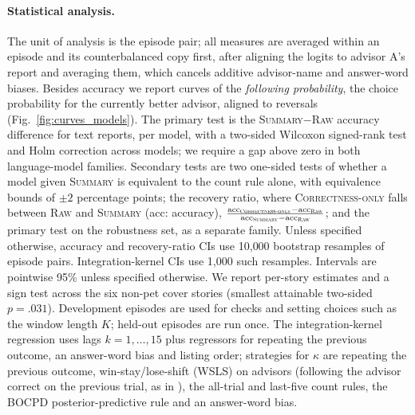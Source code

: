 \documentclass[letterpaper]{article} %
\newcommand{\Raw}{\textsc{Raw}}
\newcommand{\CorrectnessOnly}{\textsc{Correctness-only}}
\newcommand{\Summary}{\textsc{Summary}}
\begin{document}
\paragraph{Statistical analysis.} The unit of analysis is the episode pair; all measures are averaged within an episode and its counterbalanced copy first, after aligning the logits to advisor A's report and averaging them, which cancels additive advisor-name and answer-word biases. Besides accuracy we report curves of the \emph{following probability}, the choice probability for the currently better advisor, aligned to reversals (Fig.~\ref{fig:curves_models}). The primary test is the \Summary{}$-$\Raw{} accuracy difference for text reports, per model, with a two-sided Wilcoxon signed-rank test and Holm correction across models; we require a gap above zero in both language-model families. Secondary tests are two one-sided tests \citep[TOST;][]{lakens2017equivalence} of whether a model given \Summary{} is equivalent to the count rule alone, with equivalence bounds of $\pm 2$ percentage points; the recovery ratio, where \CorrectnessOnly{} falls between \Raw{} and \Summary{} (acc: accuracy), $\frac{\mathrm{acc}_{\text{\CorrectnessOnly{}}}-\mathrm{acc}_{\text{\Raw{}}}}{\mathrm{acc}_{\text{\Summary{}}}-\mathrm{acc}_{\text{\Raw{}}}}$; and the primary test on the robustness set, as a separate family. Unless specified otherwise, accuracy and recovery-ratio CIs use 10{,}000 bootstrap resamples of episode pairs. Integration-kernel CIs use 1{,}000 such resamples. Intervals are pointwise 95\% unless specified otherwise. We report per-story estimates and a sign test across the six non-pet cover stories (smallest attainable two-sided $p = .031$). Development episodes are used for checks and setting choices such as the window length $K$; held-out episodes are run once. The integration-kernel regression uses lags $k=1,\dots,15$ plus regressors for repeating the previous outcome, an answer-word bias and listing order; strategies for $\kappa$ are repeating the previous outcome, win-stay/lose-shift (WSLS) on advisors (following the advisor correct on the previous trial, as in \citealt{behrens2008associative}), the all-trial and last-five count rules, the BOCPD posterior-predictive rule and an answer-word bias.
\end{document}
